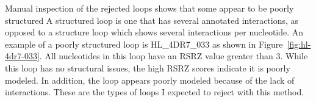 
Manual inspection of the rejected loops shows that some appear to be poorly
structured A structured loop is one that has several annotated interactions, as
opposed to a structure loop which shows several interactions per nucleotide. An
example of a poorly structured loop is HL\_4DR7\_033 as shown in
Figure~\ref{fig:hl-4dr7-033}. All nucleotides in this loop have an RSRZ value
greater than 3. While this loop has no structural issues, the high RSRZ scores
indicate it is poorly modeled. In addition, the loop appears poorly modeled
because of the lack of interactions. These are the types of loops I expected to
reject with this method.

